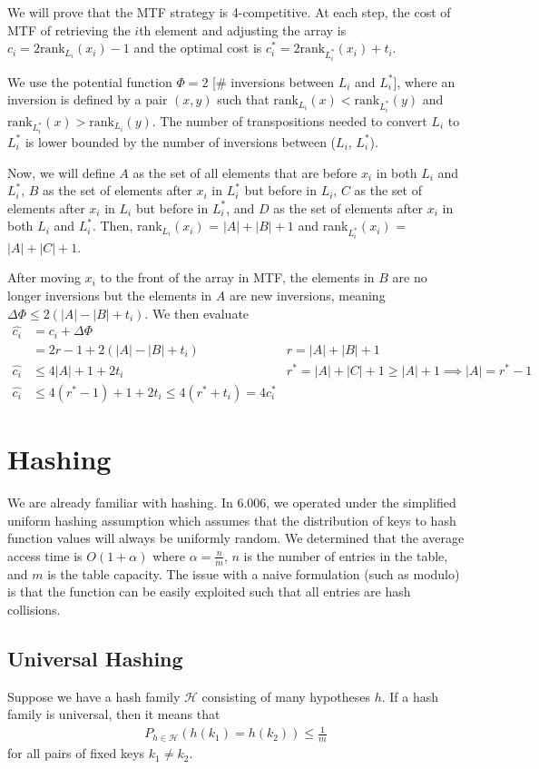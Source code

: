 \documentclass[10pt]{article}
\begin{document}
We will prove that the MTF strategy is 4-competitive. At each step, the cost of MTF of retrieving the $i$th element and adjusting the array is $c_i = 2 \text{rank}_{L_i}(x_i) - 1$ and the optimal cost is $c_i^* = 2 \text{rank}_{L_i^*}(x_i) + t_i$.

We use the potential function $\Phi = 2$ [\# inversions between $L_i$ and $L_i^*$], where an inversion is defined by a pair $(x, y)$ such that $\text{rank}_{L_i}(x) < \text{rank}_{L_i^*}(y)$ and $\text{rank}_{L_i^*}(x) > \text{rank}_{L_i}(y)$. The number of transpositions needed to convert $L_i$ to $L_i^*$ is lower bounded by the number of inversions between ($L_i$, $L_i^*$).

Now, we will define $A$ as the set of all elements that are before $x_i$ in both $L_i$ and $L_i^*$, $B$ as the set of elements after $x_i$ in $L_i^*$ but before in $L_i$, $C$ as the set of elements after $x_i$ in $L_i$ but before in $L_i^*$, and $D$ as the set of elements after $x_i$ in both $L_i$ and $L_i^*$. Then, rank$_{L_i}(x_i)$ = $|A| + |B| + 1$ and rank$_{L_i^*}(x_i)$ = $|A| + |C| + 1$.

After moving $x_i$ to the front of the array in MTF, the elements in $B$ are no longer inversions but the elements in $A$ are new inversions, meaning $\Delta \Phi \leq 2(|A| - |B| + t_i)$. We then evaluate
\begin{align*}
    \hat{c_i} &= c_i + \Delta \Phi\\
    &= 2r - 1 + 2(|A| - |B| + t_i) &r = |A| + |B| + 1\\
    \hat{c_i} &\leq 4|A| + 1 + 2 t_i &r^* = |A| + |C| + 1 \geq |A| + 1 \implies |A| = r^* - 1\\
    \hat{c_i} &\leq 4 (r^* - 1)  + 1 + 2 t_i \leq 4 (r^* + t_i) = 4 c_i^*
\end{align*}
\section{Hashing}
We are already familiar with hashing. In 6.006, we operated under the simplified uniform hashing assumption which assumes that the distribution of keys to hash function values will always be uniformly random. We determined that the average access time is $O(1 + \alpha)$ where $\alpha = \frac{n}{m}$, $n$ is the number of entries in the table, and $m$ is the table capacity. The issue with a naive formulation (such as modulo) is that the function can be easily exploited such that all entries are hash collisions.
\subsection*{Universal Hashing}
Suppose we have a hash family $\mathcal{H}$ consisting of many hypotheses $h$. If a hash family is universal, then it means that
\begin{align*}
    P_{h \in \mathcal{H}} (h(k_1) = h(k_2)) \leq \frac{1}{m}
\end{align*}
for all pairs of fixed keys $k_1 \neq k_2$.
\end{document}
